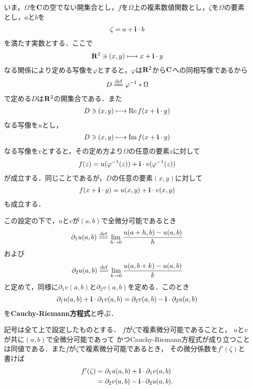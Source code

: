 	いま，$\Omega$を$\mathbf{C}$の空でない開集合とし，$f$を$\Omega$上の複素数値関数とし，$\zeta$を$\Omega$の要素とし，$a$と$b$を
	\begin{align}
		\zeta = a + \mathbf{i} \cdot b
	\end{align}
	を満たす実数とする．ここで
	\begin{align}
		\mathbf{R}^2 \ni (x,y) \longmapsto x + \mathbf{i} \cdot y
	\end{align}
	なる関係により定める写像を$\varphi$とすると，$\varphi$は$\mathbf{R}^2$から$\mathbf{C}$への同相写像であるから
	\begin{align}
		D \defeq \varphi^{-1} \ast \Omega
	\end{align}
	で定める$D$は$\mathbf{R}^2$の開集合である．また
	\begin{align}
		D \ni (x,y) \longmapsto \operatorname{Re} f(x + \mathbf{i} \cdot y)
	\end{align}
	なる写像を$u$とし，
	\begin{align}
		D \ni (x,y) \longmapsto \operatorname{Im} f(x + \mathbf{i} \cdot y)
	\end{align}
	なる写像を$v$とすると，その定め方より$\Omega$の任意の要素$z$に対して
	\begin{align}
		f(z) = u(\varphi^{-1}(z)) + \mathbf{i} \cdot v(\varphi^{-1}(z))
	\end{align}
	が成立する．同じことであるが，$D$の任意の要素$(x,y)$に対して
	\begin{align}
		f(x + \mathbf{i} \cdot y) = u(x,y) + \mathbf{i} \cdot v(x,y)
	\end{align}
	も成立する．
	
	この設定の下で，$u$と$v$が$(a,b)$で全微分可能であるとき
	\begin{align}
		\partial_1 u(a,b) \defeq \lim_{h \to 0} \frac{u(a+h,b) - u(a,b)}{h}
	\end{align}
	および
	\begin{align}
		\partial_2 u(a,b) \defeq \lim_{k \to 0} \frac{u(a,b+k) - u(a,b)}{k}
	\end{align}
	と定めて，同様に$\partial_1 v(a,b)$と$\partial_2 v(a,b)$を定める．このとき
	\begin{align}
		\partial_1 u(a,b) + \mathbf{i} \cdot \partial_1 v(a,b)
		= \partial_2 v(a,b) - \mathbf{i} \cdot \partial_2 u(a,b)
	\end{align}
	を{\bf Cauchy-Riemann方程式}と呼ぶ．
	
	\begin{screen}
		\begin{thm}
			記号は全て上で設定したものとする．
			$f$が$\zeta$で複素微分可能であることと，
			$u$と$v$が共に$(a,b)$で全微分可能であって
			かつCauchy-Riemann方程式が成り立つことは同値である．また$f$が$\zeta$で複素微分可能であるとき，
			その微分係数を$f'(\zeta)$と書けば
			\begin{align}
				f'(\zeta) &= \partial_1 u(a,b) + \mathbf{i} \cdot \partial_1 v(a,b) \\
				&= \partial_2 v(a,b) - \mathbf{i} \cdot \partial_2 u(a,b).
			\end{align}
		\end{thm}
	\end{screen}
	
